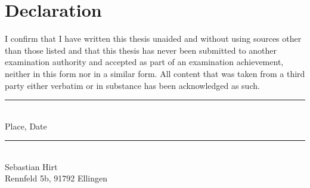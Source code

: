 \chapter*{Declaration}
\thispagestyle{empty}

\noindent
I confirm that I have written this thesis unaided and without using sources other than those listed and that this thesis has never been submitted to another examination authority and accepted as part of an examination achievement, neither in this form nor in a similar form.
All content that was taken from a third party either verbatim or in substance has been acknowledged as such.

\vspace{3cm}

\begin{minipage}[t]{0.45\textwidth}
    \rule{\textwidth}{0.5pt}\\
	Place, Date
\end{minipage}
\hfill
\begin{minipage}[t]{0.45\textwidth}
	\rule{\textwidth}{0.5pt}\\
	Sebastian Hirt\\
    Rennfeld 5b, 91792 Ellingen
\end{minipage}
